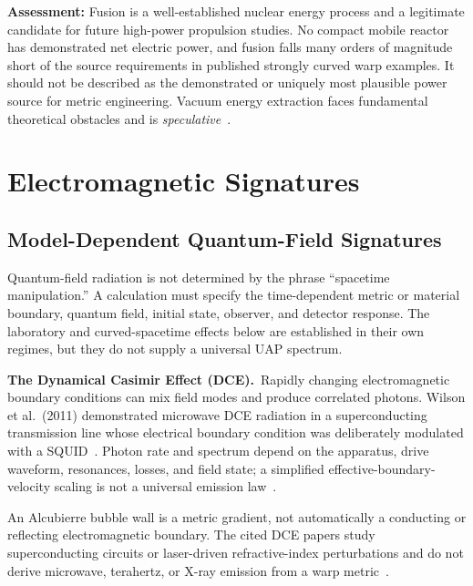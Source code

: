 \documentclass[aps,prd,twocolumn,superscriptaddress,nofootinbib,floatfix]{revtex4-2}
\begin{document}
\textbf{Assessment:} Fusion is a well-established nuclear energy process and a
legitimate candidate for future high-power propulsion studies. No compact mobile
reactor has demonstrated net electric power, and fusion falls many orders of
magnitude short of the source requirements in published strongly curved warp
examples. It should not be described as the demonstrated or uniquely most
plausible power source for metric engineering. Vacuum energy extraction faces
fundamental theoretical obstacles and is
\emph{speculative}~\cite{DIRD_Miley,DIRD_Davis_Vacuum,DIRD_Davis_Tomography,DIRD_Teofilo,LLNL_NIF2025}.

\section{Electromagnetic Signatures}\label{sec:em-signatures}

\subsection{Model-Dependent Quantum-Field Signatures}\label{sec:em-prediction}

Quantum-field radiation is not determined by the phrase ``spacetime
manipulation.'' A calculation must specify the time-dependent metric or material
boundary, quantum field, initial state, observer, and detector response. The
laboratory and curved-spacetime effects below are established in their own
regimes, but they do not supply a universal UAP spectrum.

\textbf{The Dynamical Casimir Effect (DCE).}\ Rapidly changing electromagnetic
boundary conditions can mix field modes and produce correlated photons. Wilson et
al.~(2011) demonstrated microwave DCE radiation in a superconducting transmission
line whose electrical boundary condition was deliberately modulated with a
SQUID~\cite{Wilson2011}. Photon rate and spectrum depend on the apparatus, drive
waveform, resonances, losses, and field state; a simplified
effective-boundary-velocity scaling is not a universal emission
law~\cite{Wilson2011,Schutzhold2011}.

An Alcubierre bubble wall is a metric gradient, not automatically a conducting or
reflecting electromagnetic boundary. The cited DCE papers study superconducting
circuits or laser-driven refractive-index perturbations and do not derive
microwave, terahertz, or X-ray emission from a warp
metric~\cite{Alcubierre1994,Wilson2011,Schutzhold2011}.
\end{document}

